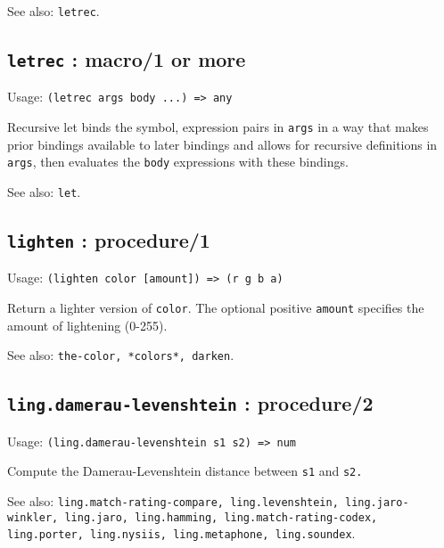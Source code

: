 \documentclass[
]{article}
\newcommand{\passthrough}[1]{#1}
\begin{document}
See also: \passthrough{\lstinline!letrec!}.

\hypertarget{letrec-macro1-or-more-1}{%
\subsection{\texorpdfstring{\texttt{letrec} : macro/1 or
more}{letrec : macro/1 or more}}\label{letrec-macro1-or-more-1}}

Usage: \passthrough{\lstinline!(letrec args body ...) => any!}

Recursive let binds the symbol, expression pairs in
\passthrough{\lstinline!args!} in a way that makes prior bindings
available to later bindings and allows for recursive definitions in
\passthrough{\lstinline!args!}, then evaluates the
\passthrough{\lstinline!body!} expressions with these bindings.

See also: \passthrough{\lstinline!let!}.

\hypertarget{lighten-procedure1-1}{%
\subsection{\texorpdfstring{\texttt{lighten} :
procedure/1}{lighten : procedure/1}}\label{lighten-procedure1-1}}

Usage: \passthrough{\lstinline!(lighten color [amount]) => (r g b a)!}

Return a lighter version of \passthrough{\lstinline!color!}. The
optional positive \passthrough{\lstinline!amount!} specifies the amount
of lightening (0-255).

See also: \passthrough{\lstinline!the-color, *colors*, darken!}.

\hypertarget{ling.damerau-levenshtein-procedure2-1}{%
\subsection{\texorpdfstring{\texttt{ling.damerau-levenshtein} :
procedure/2}{ling.damerau-levenshtein : procedure/2}}\label{ling.damerau-levenshtein-procedure2-1}}

Usage: \passthrough{\lstinline!(ling.damerau-levenshtein s1 s2) => num!}

Compute the Damerau-Levenshtein distance between
\passthrough{\lstinline!s1!} and \passthrough{\lstinline!s2.!}

See also:
\passthrough{\lstinline!ling.match-rating-compare, ling.levenshtein, ling.jaro-winkler, ling.jaro, ling.hamming, ling.match-rating-codex, ling.porter, ling.nysiis, ling.metaphone, ling.soundex!}.
\end{document}
